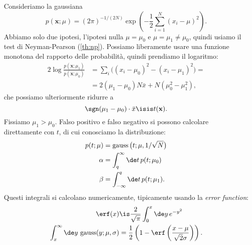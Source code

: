 \begin{solution*}
	Consideriamo la gaussiana
	\begin{equation*}
		p(\mathbf x;\mu)
		= (2\pi)^{-1/(2N)}
		\exp \left( -\frac12 \sum_{i=1}^N (x_i-\mu)^2 \right).
	\end{equation*}
	Abbiamo solo due ipotesi,
	l'ipotesi nulla $\mu=\mu_0$ e $\mu=\mu_1\neq\mu_0$,
	quindi usiamo il test di Neyman-Pearson (\autoref{th:np}).
	Possiamo liberamente usare una funzione monotona del rapporto delle probabilità,
	quindi prendiamo il logaritmo:
	\begin{align*}
		2\log \frac {p(\mathbf x;\mu_1)} {p(\mathbf x;\mu_0)}
		&= \sum_i \big((x_i-\mu_0)^2 - (x_i-\mu_1)^2\big) = \\
		&= 2(\mu_1-\mu_0)N\bar x + N(\mu_0^2-\mu_1^2),
	\end{align*}
	che possiamo ulteriormente ridurre a
	\begin{equation*}
		\sgn(\mu_1-\mu_0)\cdot \bar x
		\isis t(\mathbf x).
	\end{equation*}
	Fissiamo $\mu_1 > \mu_0$.
	Falso positivo e falso negativo si possono calcolare direttamente con $t$,
	di cui conosciamo la distribuzione:
	\begin{align*}
		p(t;\mu)
		&= \operatorname{gauss}\big(t;\mu,1/\sqrt N\big) \\
		\alpha
		&= \int_q^\infty \de t\, p(t;\mu_0) \\
		\beta
		&= \int_{-\infty}^q \de t\, p(t;\mu_1).
	\end{align*}
	Questi integrali si calcolano numericamente,
	tipicamente usando la \emph{error function}:
	\begin{align*}
		\erf(x)
		&\is \frac2{\sqrt\pi} \int_0^x \de y\,e^{-y^2} \\
		\int_x^\infty \de y\, \operatorname{gauss}(y;\mu,\sigma)
		&= \frac12 \left( 1 - \erf\left(\frac{x-\mu}{\sqrt2\sigma}\right) \right).
	\end{align*}
\end{solution*}
